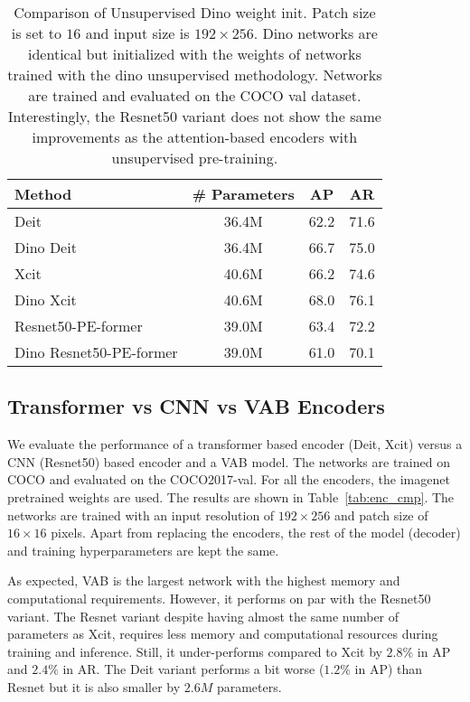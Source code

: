 \documentclass[runningheads]{llncs}
\begin{document}
\begin{table}[t]
  \centering
  \begin{tabular}{|l||c|c|c|}
   \hline 
   {\bf Method} &  {\bf \# Parameters} & {\bf AP} & {\bf AR} \\
   \hline\hline
   Deit               & 36.4M & 62.2 & 71.6 \\ 
   \hline
   Dino Deit          & 36.4M & 66.7 & 75.0 \\ 
   \hline
   Xcit               & 40.6M & 66.2 & 74.6 \\ 
   \hline
   Dino Xcit          & 40.6M & 68.0 & 76.1 \\ 
   \hline\hline
   Resnet50-PE-former      & 39.0M & 63.4 & 72.2 \\ 
   \hline
   Dino Resnet50-PE-former & 39.0M & 61.0 & 70.1 \\ 
   \hline
  \end{tabular}
  \caption{Comparison of Unsupervised Dino weight init. 
  Patch size is set to $16$ and input size is $192 \times 256$. Dino networks are 
  identical but initialized with the weights of networks trained  with the dino unsupervised methodology.   Networks are trained and evaluated on the COCO val dataset. Interestingly, the Resnet50 variant does not show the same improvements as the attention-based encoders with unsupervised pre-training.}

  \label{tab:unsupervised}
\end{table}

\subsection{Transformer vs CNN vs VAB Encoders}
\label{sec:enc_cmp}
We evaluate the performance of a transformer based encoder (Deit, Xcit) versus a 
CNN (Resnet50) based encoder and a VAB model. The networks are trained on COCO 
and evaluated on the COCO2017-val. 
For all the encoders, the imagenet pretrained weights are used. The results are shown in Table~\ref{tab:enc_cmp}. The networks are trained with an input resolution of $192 \times 256$ and patch size of $16 \times 16$ pixels.
Apart from replacing the encoders, the rest of the model (decoder) and training hyperparameters are kept the same.

As expected, VAB is the largest network with the highest memory and computational requirements. 
However, it performs on par with the Resnet50 variant. The Resnet variant despite having almost the same number of parameters as Xcit, requires less memory and computational resources during training and inference. Still, it under-performs compared to Xcit by $2.8\%$ in AP and $2.4\%$ in AR.
The Deit variant performs a bit worse ($1.2\%$ in AP) than Resnet but it is also smaller by $2.6M$ parameters. 
\end{document}
